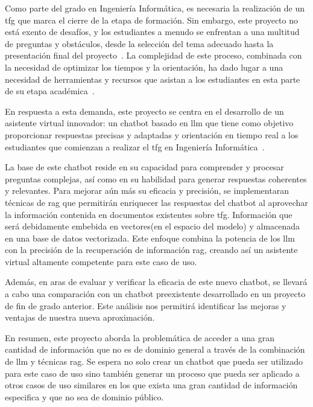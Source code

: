 
Como parte del grado en Ingeniería Informática, es necesaria la realización de un \acrfull{tfg} que marca el cierre de la etapa de formación. Sin embargo, este proyecto no está exento de desafíos, y los estudiantes a menudo se enfrentan a una multitud de preguntas y obstáculos, desde la selección del tema adecuado hasta la presentación final del proyecto~\cite{lopez2010final}. La complejidad de este proceso, combinada con la necesidad de optimizar los tiempos y la orientación, ha dado lugar a una necesidad de herramientas y recursos que asistan a los estudiantes en esta parte de su etapa académica~\cite{lopez2009proceso}.

En respuesta a esta demanda, este proyecto se centra en el desarrollo de un asistente virtual innovador: un chatbot basado en \acrfull{llm} que tiene como objetivo proporcionar respuestas precisas y adaptadas y orientación en tiempo real a los estudiantes que comienzan a realizar el \acrshort{tfg} en Ingeniería Informática~\cite{Lewis2020}.

La base de este chatbot reside en su capacidad para comprender y procesar preguntas complejas, así como en su habilidad para generar respuestas coherentes y relevantes. Para mejorar aún más su eficacia y precisión, se implementaran técnicas de \acrfull{rag} que permitirán enriquecer las respuestas del chatbot al aprovechar la información contenida en documentos existentes sobre \acrshort{tfg}. Información que será debidamente embebida en vectores(en el espacio del modelo) y almacenada en una base de datos vectorizada. Este enfoque combina la potencia de los \acrshort{llm} con la precisión de la recuperación de información \acrshort{rag}, creando así un asistente virtual altamente competente para este caso de uso.

Además, en aras de evaluar y verificar la eficacia de este nuevo chatbot, se llevará a cabo una comparación con un chatbot preexistente desarrollado en un proyecto de fin de grado anterior. Este análisis nos permitirá identificar las mejoras y ventajas de nuestra nueva aproximación.

En resumen, este proyecto aborda la problemática de acceder a una gran cantidad de información que no es de dominio general a través de la combinación de \acrshort{llm} y técnicas \acrshort{rag}. Se espera no solo crear un chatbot que pueda ser utilizado para este caso de uso sino también generar un proceso que pueda ser aplicado a otros casos de uso similares en los que exista una gran cantidad de información especifica y que no sea de dominio público. 





